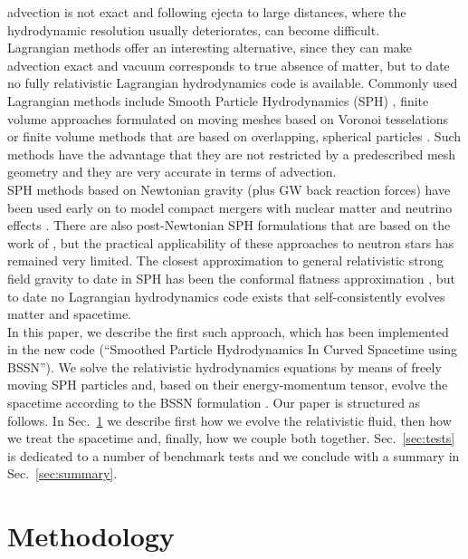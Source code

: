 \documentclass[useAMS,usenatbib]{iopart}
\begin{document}
advection is not exact and following ejecta to large distances, where the hydrodynamic resolution 
usually deteriorates, can become difficult. \\
Lagrangian methods offer an interesting alternative, since they can make advection exact and vacuum
corresponds to true absence of matter, but to date no fully relativistic Lagrangian hydrodynamics 
code is available. Commonly used Lagrangian methods include Smooth Particle Hydrodynamics (SPH)
\cite{monaghan05,rosswog09b,springel10a,price12a,rosswog15c}, finite volume approaches formulated
on moving meshes based on Voronoi tesselations \cite{springel10b,duffell11} or finite volume methods
that are based on overlapping, spherical particles \cite{gaburov11,hopkins15a,hubber18}. Such methods have the
advantage that they are not restricted by a predescribed  mesh geometry and they are very accurate in 
terms of advection.\\
SPH methods based on Newtonian gravity (plus GW back reaction forces) have been used early on 
to model compact mergers with nuclear matter and neutrino effects 
\cite{rosswog99,rosswog02a,rosswog03a,rosswog03c}. There are also post-Newtonian SPH formulations
\cite{faber00,ayal01,faber01} that are based on the work of \cite{blanchet90}, but the practical applicability of these 
approaches to neutron stars has remained very limited. The closest approximation to general relativistic
strong field gravity to date in SPH has been the conformal 
flatness approximation \cite{oechslin02,oechslin04,faber06a,faber06b,bauswein10a}, 
but to date no Lagrangian hydrodynamics code exists that self-consistently evolves matter and spacetime.\\
In this paper, we describe the first such approach, which has been implemented in the new code
 \SpB (``Smoothed Particle Hydrodynamics In Curved Spacetime using BSSN''). We solve the relativistic hydrodynamics equations
by means of freely moving SPH particles and, based on their energy-momentum tensor, evolve the 
spacetime according to the BSSN formulation  \cite{nakamura87,shibata95,baumgarte99}. 
Our paper is structured as follows. In Sec.~\ref{sec:meth} we describe first how we evolve the relativistic 
fluid,  then how we treat the spacetime and, finally, how we couple both together. Sec.~\ref{sec:tests} is dedicated to  a 
number of benchmark tests and we  conclude with a summary in Sec.~\ref{sec:summary}.

\section{Methodology}
\label{sec:meth}
\end{document}
